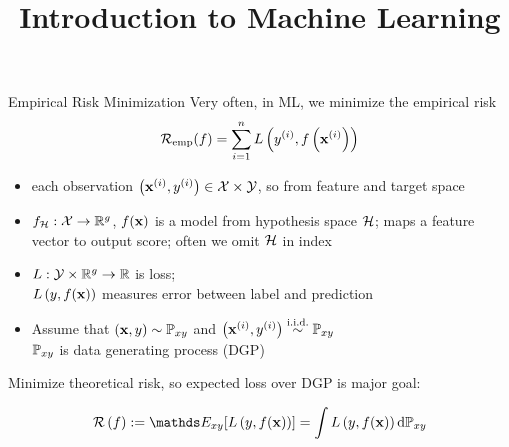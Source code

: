 \documentclass[11pt,compress,t,notes=noshow, xcolor=table]{beamer}
\title{Introduction to Machine Learning}
\begin{document}
    

\begin{vbframe}{Empirical Risk Minimization}
Very often, in ML, we minimize the empirical risk
\vspace{-0.3cm}
$$\mathcal{R}_{\text{emp}}(f) = \sum\limits_{i=1}^n L\left(y^{(i)}, f\left(\mathbf{x}^{(i)}\right)\right)$$
\vspace{-0.2cm}
{\small
\begin{itemize}\setlength\itemsep{0.5pt} 
    \item each observation $\left(\mathbf{x}^{(i)}, y^{(i)}\right) \in  \mathcal{X} \times \mathcal{Y}$,
    so from feature and target space
    \item $f_{\mathcal{H}}:\mathcal{X} \rightarrow \mathbb{R}^g$, 
    $f(\mathbf{x})$ is a model from hypothesis space $\mathcal{H}$;
    maps a feature vector to output score;
    often we omit $\mathcal{H}$ in index 
    \item $L:\mathcal{Y}\times\mathbb{R}^g\rightarrow\mathbb{R}$ is loss;\\
    $L\left(y, f(\mathbf{x})\right)$ measures error between label and prediction
    \item Assume that $(\mathbf{x},y) \sim \mathbb{P}_{xy}$ and $\left(\mathbf{x}^{(i)}, y^{(i)}\right)  \overset{\text{i.i.d.}}{\sim} \mathbb{P}_{xy}$ \\
    $\mathbb{P}_{xy}$ is data generating process (DGP)
\end{itemize}
}
Minimize theoretical risk, so expected loss over DGP is major goal:

$$ \risk \left(f\right) := \E_{xy} [\Lxy] = \int \Lxy \text{d}\Pxy $$
\end{vbframe}
\end{document}
